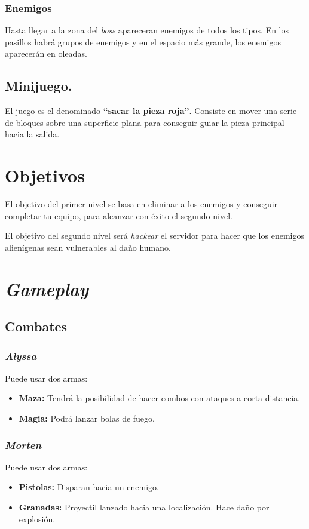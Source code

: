 \documentclass[11pt, twoside]{article}
\begin{document}
\subsubsection{Enemigos}

Hasta llegar a la zona del \textit{boss} apareceran enemigos de todos los tipos. En los pasillos habrá grupos de enemigos y en el espacio más grande, los enemigos aparecerán en oleadas.

\subsection{Minijuego.}

El juego es el denominado \textbf{``sacar la pieza roja''}. Consiste en mover una serie de bloques sobre una superficie plana para conseguir guiar la pieza principal hacia la salida.


\pagestyle{notsection}

\newpage

\pagestyle{insection}
\section{Objetivos}

El objetivo del primer nivel se basa en eliminar a los enemigos y conseguir completar tu equipo, para alcanzar con éxito el segundo nivel.

El objetivo del segundo nivel será \textit{hackear} el servidor para hacer que los enemigos alienígenas sean vulnerables al daño humano. 
\newpage

\pagestyle{insection}
\section{\textit{Gameplay}}

\subsection{Combates}
\subsubsection{\textit{Alyssa}}
Puede usar dos armas:
\begin{itemize}
	\item \textbf{Maza:} Tendrá la posibilidad de hacer combos con ataques a corta distancia.
	\item \textbf{Magia:} Podrá lanzar bolas de fuego.
\end{itemize}

\subsubsection{\textit{Morten}}
Puede usar dos armas:
\begin{itemize}
	\item \textbf{Pistolas:} Disparan hacia un enemigo.
	\item \textbf{Granadas:} Proyectil lanzado hacia una localización. Hace daño por explosión. 
\end{itemize}
\end{document}

